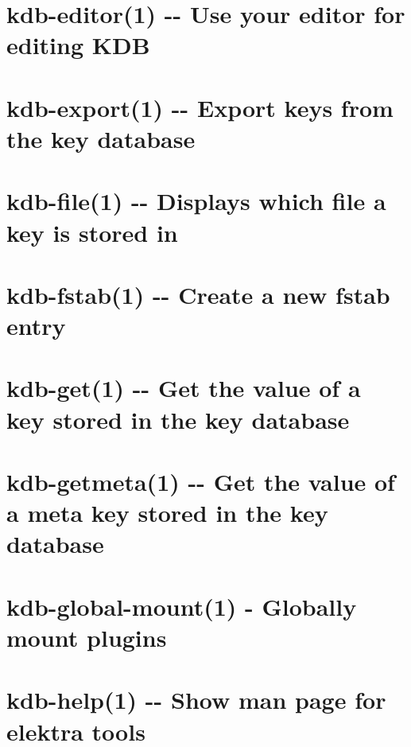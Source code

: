 \documentclass[twoside]{book}
\newcommand{\+}{\discretionary{\mbox{\scriptsize$\hookleftarrow$}}{}{}}
\begin{document}
\chapter{kdb-\/editor(1) -\/-\/ Use your editor for editing K\+D\+B}
\label{md_doc_help_kdb-editor}
\hypertarget{md_doc_help_kdb-editor}{}

\chapter{kdb-\/export(1) -\/-\/ Export keys from the key database}
\label{md_doc_help_kdb-export}
\hypertarget{md_doc_help_kdb-export}{}

\chapter{kdb-\/file(1) -\/-\/ Displays which file a key is stored in}
\label{md_doc_help_kdb-file}
\hypertarget{md_doc_help_kdb-file}{}

\chapter{kdb-\/fstab(1) -\/-\/ Create a new fstab entry}
\label{md_doc_help_kdb-fstab}
\hypertarget{md_doc_help_kdb-fstab}{}

\chapter{kdb-\/get(1) -\/-\/ Get the value of a key stored in the key database}
\label{md_doc_help_kdb-get}
\hypertarget{md_doc_help_kdb-get}{}

\chapter{kdb-\/getmeta(1) -\/-\/ Get the value of a meta key stored in the key database}
\label{md_doc_help_kdb-getmeta}
\hypertarget{md_doc_help_kdb-getmeta}{}

\chapter{kdb-\/global-\/mount(1) -\/ Globally mount plugins}
\label{md_doc_help_kdb-global-mount}
\hypertarget{md_doc_help_kdb-global-mount}{}

\chapter{kdb-\/help(1) -\/-\/ Show man page for elektra tools}
\label{md_doc_help_kdb-help}
\hypertarget{md_doc_help_kdb-help}{}

\end{document}

